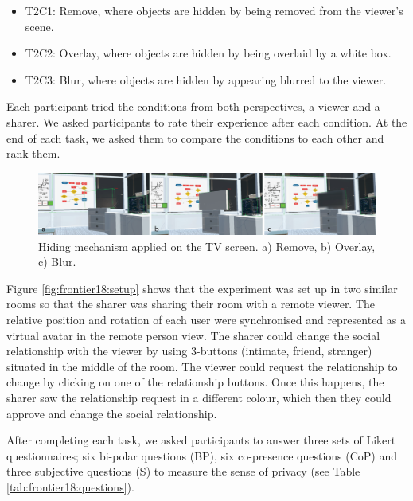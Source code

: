 \begin{itemize}
\item T2C1: Remove, where objects are hidden by being removed from the viewer's scene.
\item T2C2: Overlay, where objects are hidden by being overlaid by a white box. 
\item T2C3: Blur, where objects are hidden by appearing blurred to the viewer. 
\end{itemize}

Each participant tried the conditions from both perspectives, a viewer and a sharer. We asked participants to rate their experience after each condition. At the end of each task, we asked them to compare the conditions to each other and rank them. 

\begin{figure}
\begin{center}
\includegraphics[width=\linewidth]{images/frontier18/images-01.png}
\caption{Hiding mechanism applied on the TV screen. a) Remove, b) Overlay, c) Blur.}\label{fig:frontier18:hiding-mechanism}
\end{center}
\end{figure}

Figure \ref{fig:frontier18:setup} shows that the experiment was set up in two similar rooms so that the sharer was sharing their room with a remote viewer. The relative position and rotation of each user were synchronised and represented as a virtual avatar in the remote person view. The sharer could change the social relationship with the viewer by using 3-buttons (intimate, friend, stranger) situated in the middle of the room. The viewer could request the relationship to change by clicking on one of the relationship buttons. Once this happens, the sharer saw the relationship request in a different colour, which then they could approve and change the social relationship.

After completing each task, we asked participants to answer three sets of Likert questionnaires; six bi-polar questions (BP), six co-presence questions (CoP) and three subjective questions (S) to measure the sense of privacy (see Table \ref{tab:frontier18:questions}).  

